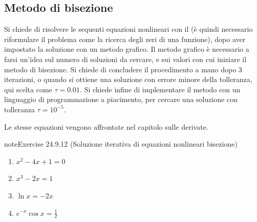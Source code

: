 \documentclass[letterpaper,10pt,italian]{jupyterBook}
\begin{document}
\subsection{Metodo di bisezione}
\label{\detokenize{ch/infinitesimal_calculus/analysis-problems:metodo-di-bisezione}}\label{\detokenize{ch/infinitesimal_calculus/analysis-problems:infinitesimal-calculus-analysis-problems-bisection}}
\sphinxAtStartPar
Si chiede di risolvere le sequenti equazioni nonlineari con il {\hyperref[\detokenize{ch/infinitesimal_calculus/analysis:infinitesimal-calculus-analysis-bisec}]{}} (è quindi necessario riformulare il problema come la ricerca degli zeri di una funzione), dopo aver impostato la soluzione con un metodo grafico. Il metodo grafico è necessario a farsi un’idea sul numero di soluzioni da cercare, e sui valori con cui iniziare il metodo di bisezione. Si chiede di concludere il procedimento a mano dopo 3 iterazioni, o quando si ottiene una soluzione con errore minore della tolleranza, qui scelta come \(\tau = 0.01\). Si chiede infine di implementare il metodo con un linguaggio di programmazione a piacimento, per cercare una soluzione con tolleranza \(\tau = 10^{-5}\).

\sphinxAtStartPar
Le stesse equazioni vengono affrontate {\hyperref[\detokenize{ch/infinitesimal_calculus/derivatives-problems:infinitesimal-calculus-derivatives-problems-newton}]{}} nel capitolo sulle derivate.
 \label{exercise:ch/infinitesimal_calculus/analysis-problems-exercise-11}

\begin{sphinxadmonition}{note}{Exercise 24.9.12 (Soluzione iterativa di equazioni nonlineari \sphinxhyphen{} bisezione)}


\begin{enumerate}
%
\item {} 
\sphinxAtStartPar
\(x^2 - 4x + 1 = 0 \)

\item {} 
\sphinxAtStartPar
\(x^3 - 2x = 1\)

\item {} 
\sphinxAtStartPar
\(\ln x = - 2 x\)

\item {} 
\sphinxAtStartPar
\(e^{-x} \cos x = \frac{1}{2}\)

\end{enumerate}
\end{sphinxadmonition}
\end{document}
